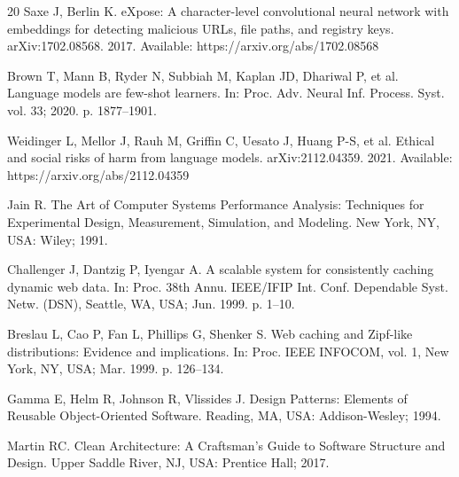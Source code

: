 \documentclass[pdflatex,sn-mathphys-num]{sn-jnl}%
\theoremstyle{thmstyleone}%
\theoremstyle{thmstyletwo}%
\theoremstyle{thmstylethree}%
\begin{document}
\begin{thebibliography}{20}
 Saxe J, Berlin K. eXpose: A character-level convolutional neural network with embeddings for detecting malicious URLs, file paths, and registry keys. arXiv:1702.08568. 2017. Available: https://arxiv.org/abs/1702.08568

 Brown T, Mann B, Ryder N, Subbiah M, Kaplan JD, Dhariwal P, et al. Language models are few-shot learners. In: Proc. Adv. Neural Inf. Process. Syst. vol. 33; 2020. p. 1877--1901.

 Weidinger L, Mellor J, Rauh M, Griffin C, Uesato J, Huang P-S, et al. Ethical and social risks of harm from language models. arXiv:2112.04359. 2021. Available: https://arxiv.org/abs/2112.04359

 Jain R. The Art of Computer Systems Performance Analysis: Techniques for Experimental Design, Measurement, Simulation, and Modeling. New York, NY, USA: Wiley; 1991.

 Challenger J, Dantzig P, Iyengar A. A scalable system for consistently caching dynamic web data. In: Proc. 38th Annu. IEEE/IFIP Int. Conf. Dependable Syst. Netw. (DSN), Seattle, WA, USA; Jun. 1999. p. 1--10.

 Breslau L, Cao P, Fan L, Phillips G, Shenker S. Web caching and Zipf-like distributions: Evidence and implications. In: Proc. IEEE INFOCOM, vol. 1, New York, NY, USA; Mar. 1999. p. 126--134.

 Gamma E, Helm R, Johnson R, Vlissides J. Design Patterns: Elements of Reusable Object-Oriented Software. Reading, MA, USA: Addison-Wesley; 1994.

 Martin RC. Clean Architecture: A Craftsman's Guide to Software Structure and Design. Upper Saddle River, NJ, USA: Prentice Hall; 2017.

\end{thebibliography}
\end{document}
